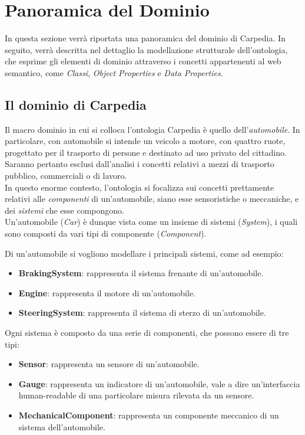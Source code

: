 \chapter{Panoramica del Dominio}
In questa sezione verrà riportata una panoramica del dominio di Carpedia. In seguito, verrà descritta nel dettaglio la modellazione strutturale dell'ontologia, che esprime gli elementi di dominio attraverso i concetti
appartenenti al web semantico, come \textit{Classi}, \textit{Object Properties} e \textit{Data Properties}.

\section{Il dominio di Carpedia}
Il macro dominio in cui si colloca l'ontologia Carpedia è quello dell'\textit{automobile}. In particolare, con automobile si intende un veicolo a motore, con quattro ruote, progettato per il trasporto di persone
e destinato ad uso privato del cittadino. Saranno pertanto esclusi dall'analisi i concetti relativi a mezzi di trasporto pubblico, commerciali o di lavoro.\\

In questo enorme contesto, l'ontologia si focalizza sui concetti prettamente relativi alle \textit{componenti} di un'automobile, siano esse sensoristiche o meccaniche, e dei \textit{sistemi} che
esse compongono.\\

Un'automobile (\textit{Car}) è dunque vista come un insieme di sistemi (\textit{System}), i quali sono composti da vari tipi di componente (\textit{Component}).

Di un'automobile si vogliono modellare i principali sistemi, come ad esempio:

\begin{itemize}
    \item \textbf{BrakingSystem}: rappresenta il sistema frenante di un'automobile.
    \item \textbf{Engine}: rappresenta il motore di un'automobile.
    \item \textbf{SteeringSystem}: rappresenta il sistema di sterzo di un'automobile.
\end{itemize}

Ogni sistema è composto da una serie di componenti, che possono essere di tre tipi:
\begin{itemize}
    \item \textbf{Sensor}: rappresenta un sensore di un'automobile.
    \item \textbf{Gauge}: rappresenta un indicatore di un'automobile, vale a dire un'interfaccia human-readable di una particolare misura rilevata da un sensore.
    \item \textbf{MechanicalComponent}: rappresenta un componente meccanico di un sistema dell'automobile.
\end{itemize}


